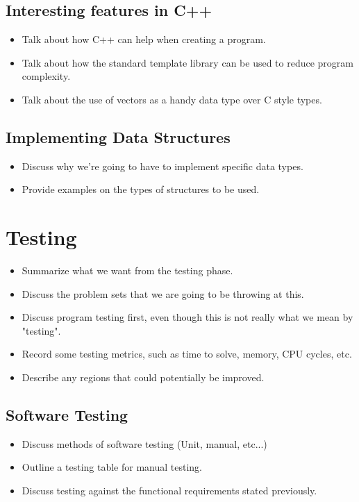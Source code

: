 \documentclass{article}
\begin{document}
\subsection{Interesting features in C++}
\begin{itemize}
    \item Talk about how C++ can help when creating a program.
    \item Talk about how the standard template library can be used to reduce program complexity.
    \item Talk about the use of vectors as a handy data type over C style types.
\end{itemize}

\subsection{Implementing Data Structures}
\begin{itemize}
    \item Discuss why we're going to have to implement specific data types.
    \item Provide examples on the types of structures to be used.
\end{itemize}

\section{Testing}
\begin{itemize}
    \item Summarize what we want from the testing phase.
    \item Discuss the problem sets that we are going to be throwing at this.
    \item Discuss program testing first, even though this is not really what we mean by "testing".
    \item Record some testing metrics, such as time to solve, memory, CPU cycles, etc.
    \item Describe any regions that could potentially be improved.
\end{itemize}

\subsection{Software Testing}
\begin{itemize}
    \item Discuss methods of software testing (Unit, manual, etc...)
    \item Outline a testing table for manual testing.
    \item Discuss testing against the functional requirements stated previously.
\end{itemize}
\end{document}

